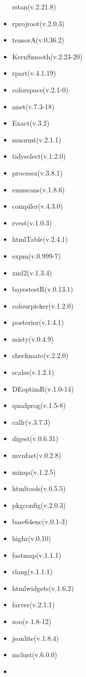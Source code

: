 \documentclass[
]{article}
\begin{document}
\begin{itemize}
  rstan(v.2.21.8)
\item
  rprojroot(v.2.0.3)
\item
  tensorA(v.0.36.2)
\item
  KernSmooth(v.2.23-20)
\item
  rpart(v.4.1.19)
\item
  colorspace(v.2.1-0)
\item
  nnet(v.7.3-18)
\item
  Exact(v.3.2)
\item
  mnormt(v.2.1.1)
\item
  tidyselect(v.1.2.0)
\item
  processx(v.3.8.1)
\item
  emmeans(v.1.8.6)
\item
  compiler(v.4.3.0)
\item
  rvest(v.1.0.3)
\item
  htmlTable(v.2.4.1)
\item
  expm(v.0.999-7)
\item
  xml2(v.1.3.4)
\item
  bayestestR(v.0.13.1)
\item
  colourpicker(v.1.2.0)
\item
  posterior(v.1.4.1)
\item
  misty(v.0.4.9)
\item
  checkmate(v.2.2.0)
\item
  scales(v.1.2.1)
\item
  DEoptimR(v.1.0-14)
\item
  quadprog(v.1.5-8)
\item
  callr(v.3.7.3)
\item
  digest(v.0.6.31)
\item
  mvnfast(v.0.2.8)
\item
  minqa(v.1.2.5)
\item
  htmltools(v.0.5.5)
\item
  pkgconfig(v.2.0.3)
\item
  base64enc(v.0.1-3)
\item
  highr(v.0.10)
\item
  fastmap(v.1.1.1)
\item
  rlang(v.1.1.1)
\item
  htmlwidgets(v.1.6.2)
\item
  farver(v.2.1.1)
\item
  zoo(v.1.8-12)
\item
  jsonlite(v.1.8.4)
\item
  mclust(v.6.0.0)
\item

\end{itemize}
\end{document}
